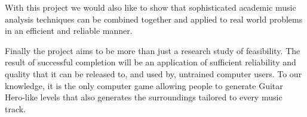 With this project we would also like to show that sophisticated academic music analysis techniques can be combined together and applied to real world problems in an efficient and reliable manner. 

Finally the project aims to be more than just a research study of feasibility. The result of successful completion will be an application of sufficient reliability and quality that it can be released to, and used by, untrained computer users. To our knowledge, it is the only computer game allowing people to generate Guitar Hero-like levels that also generates the surroundings tailored to every music track.

